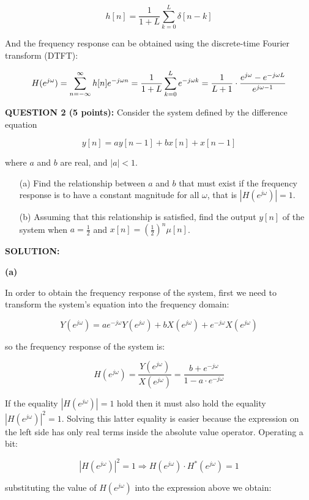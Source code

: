 \documentclass[a4paper,11pt,oneside]{article}
\begin{document}
\[
h[n] = \frac{1}{1+L}\sum_{k=0}^{L}\delta[n-k]
\]

And the frequency response can be obtained using the discrete-time Fourier transform (DTFT):

\[
H(e^{j\omega})=\sum_{n=-\infty}^{\infty}h[n]e^{-j\omega n}=\frac{1}{1+L}\sum_{k=0}^{L}e^{-j\omega k}\\
=\frac{1}{L+1}\cdot \frac{e^{j\omega}-e^{-j\omega L}}{e^{j\omega -1}}
\]


\vspace{1cm}

\textbf{QUESTION 2 (5 points):} Consider the system defined by the difference equation 

\[
y[n] = ay[n-1]+bx[n]+x[n-1]
\]

where $a$ and $b$ are real, and $|a|<1$.
\begin{itemize}
\item[(a)] Find the relationship between $a$ and $b$ that must exist if the frequency response is to have a constant magnitude for all $\omega$, that is $|H(e^{j\omega})|=1$.
\item[(b)] Assuming that this relationship is satisfied, find the output $y[n]$ of the system when $a=\frac{1}{2}$ and $x[n]=\left(\frac{1}{2}\right)^n\mu[n]$.
\end{itemize}

\vspace{1cm}

\textbf{SOLUTION:} 


\textbf{(a)}

In order to obtain the frequency response of the system, first we need to transform the system's equation into the frequency domain:

\[
Y(e^{j\omega})=ae^{-j\omega}Y(e^{j\omega})+bX(e^{j\omega})+e^{-j\omega}X(e^{j\omega})
\]

so the frequency response of the system is:

\[
H(e^{j\omega})=\frac{Y(e^{j\omega})}{X(e^{j\omega})}=\frac{b+e^{-j\omega}}{1-a\cdot e^{-j\omega}}
\]

If the equality $|H(e^{j\omega})|=1$ hold then it must also hold the equality $|H(e^{j\omega})|^2=1$. Solving this latter equality is easier because the expression on the left side has only real terms inside the absolute value operator. Operating a bit:

\[
|H(e^{j\omega})|^2=1 \Longrightarrow H(e^{j\omega})\cdot H^*(e^{j\omega})=1
\]

substituting the value of $H(e^{j\omega})$ into the expression above we obtain:
\end{document}
